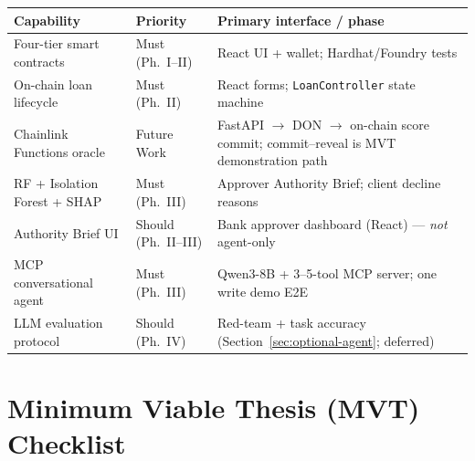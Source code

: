 \documentclass[12pt,a4paper]{report}
\newcommand{\tableheadcolor}{\rowcolor{TableHeadBg}}
\begin{document}
\begin{table}[H]
\centering
\begin{tabular}{p{3.2cm}p{2.2cm}p{7.8cm}}
\toprule
\tableheadcolor
\textbf{Capability} & \textbf{Priority} & \textbf{Primary interface / phase} \\
\midrule
Four-tier smart contracts & Must (Ph.~I--II) & React UI + wallet; Hardhat/Foundry tests \\
On-chain loan lifecycle & Must (Ph.~II) & React forms; \texttt{LoanController} state machine \\
Chainlink Functions oracle & Future Work & FastAPI $\to$ DON $\to$ on-chain score commit; commit--reveal is MVT demonstration path \\
RF + Isolation Forest + SHAP & Must (Ph.~III) & Approver Authority Brief; client decline reasons \\
Authority Brief UI & Should (Ph.~II--III) & Bank approver dashboard (React) --- \textit{not} agent-only \\
MCP conversational agent & Must (Ph.~III) & Qwen3-8B + 3--5-tool MCP server; one write demo E2E \\
LLM evaluation protocol & Should (Ph.~IV) & Red-team + task accuracy (Section~\ref{sec:optional-agent}; deferred) \\
\bottomrule
\end{tabular}
\end{table}

\section{Minimum Viable Thesis (MVT) Checklist}
\label{sec:mvt-checklist}
\end{document}
